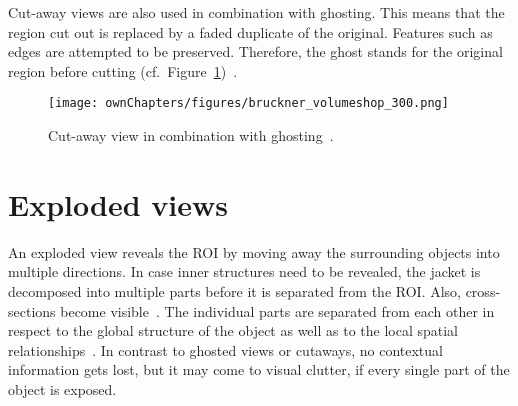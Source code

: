 Cut-away views are also used in combination with ghosting. This means that the region cut out is replaced by a faded duplicate of the original. Features such as edges are attempted to be preserved. Therefore, the ghost stands for the original region before cutting (cf.~Figure~\ref{fig:brucknerGhost})~\cite{proc:volumeshop}.
\begin{figure}
\centering
\texttt{[image: ownChapters/figures/bruckner\_volumeshop\_300.png]}
\caption{Cut-away view in combination with ghosting~\cite{proc:volumeshop}.}%
\label{fig:brucknerGhost}%
\end{figure}

\section{Exploded views}
An exploded view reveals the ROI by moving away the surrounding objects into multiple directions. In case inner structures need to be revealed, the jacket is decomposed into multiple parts before it is separated from the ROI. Also, cross-sections become visible~\cite{jour:explodedView}. The individual parts are separated from each other in respect to the global structure of the object as well as to the local spatial relationships~\cite{jour:generationExplodedView}. In contrast to ghosted views or cutaways, no contextual information gets lost, but it may come to visual clutter, if every single part of the object is exposed.

